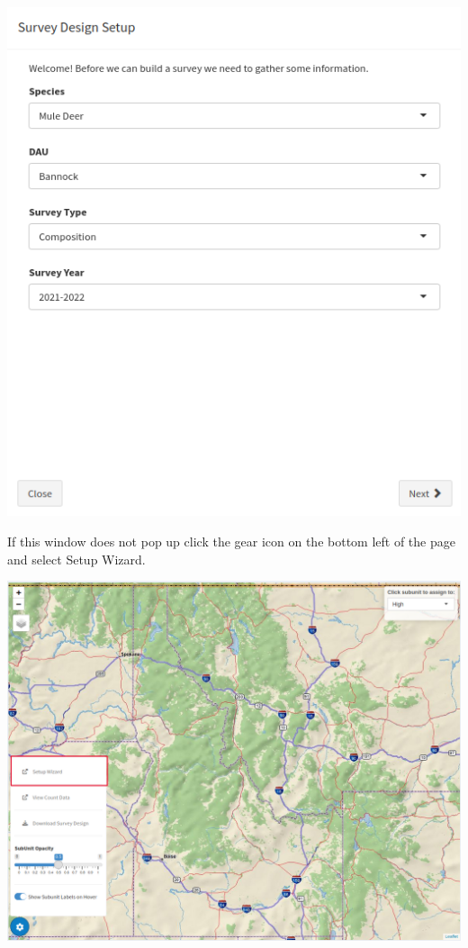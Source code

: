 \documentclass[
]{book}
\begin{document}
\includegraphics{./www/de_walk2.png}

If this window does not pop up click the gear icon on the bottom left of the page and select {Setup Wizard}.

\includegraphics{./www/de_walk3.png}
\end{document}
